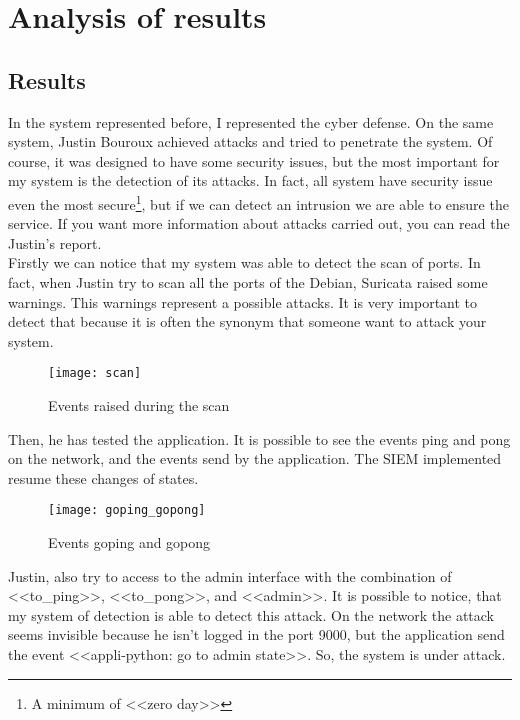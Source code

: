 
\chapter{Analysis of results}
\label{chap:analysis}


\section{Results}

In the system represented before, I represented the cyber defense. On the same system, Justin Bouroux achieved
attacks and tried to penetrate the system. Of course, it was designed to have some security issues, but the most
important for my system is the detection of its attacks. In fact, all system have security issue even the most
secure\footnote{A minimum of <<zero day>>}, but if we can detect an intrusion we are able to ensure the service. If
you want more information about attacks carried out, you can read the Justin's report.
~\\

Firstly we can notice that my system was able to detect the scan of ports. In fact, when Justin try to scan all the
ports of the Debian, Suricata raised some warnings. This warnings represent a possible attacks. It is very important
to detect that because it is often the synonym that someone want to attack your system.

\begin{figure}[h]
  \centering
  \texttt{[image: scan]}
  \caption{Events raised during the scan}
  \label{fig:scan}
\end{figure}



Then, he has tested the application. It is possible to see the events ping and pong on the network, and the events
send by the application. The SIEM implemented resume these changes of states.

\begin{figure}[h]
  \centering
  \texttt{[image: goping\_gopong]}
  \caption{Events goping and gopong}
  \label{fig:gopong}
\end{figure}


Justin, also try to access to the admin interface with the combination of <<to\_ping>>, <<to\_pong>>, and
<<admin>>. It is possible to notice, that my system of detection is able to detect this attack. On the network the
attack seems invisible because he isn't logged in the port 9000, but the application send the event <<appli-python:
go to admin state>>. So, the system is under attack.

